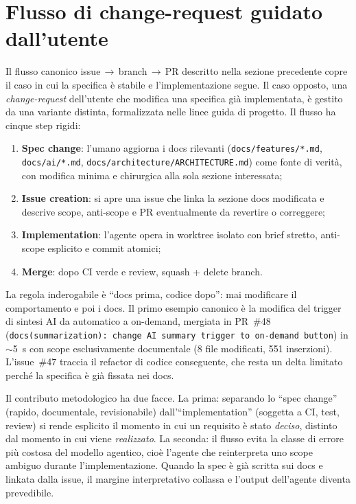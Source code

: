 \section{Flusso di change-request guidato dall'utente}
\label{sec:change-request}
Il flusso canonico issue\,$\to$\,branch\,$\to$\,PR descritto nella
sezione precedente copre il caso in cui la specifica è stabile e
l'implementazione segue. Il caso opposto, una \emph{change-request}
dell'utente che modifica una specifica già implementata, è gestito da una
variante distinta, formalizzata nelle linee guida di progetto. Il flusso
ha cinque step rigidi:
\begin{enumerate}
  \item \textbf{Spec change}: l'umano aggiorna i docs rilevanti
        (\texttt{docs/features/*.md}, \texttt{docs/ai/*.md},
        \texttt{docs/architecture/ARCHITECTURE.md}) come fonte di verità,
        con modifica minima e chirurgica alla sola sezione interessata;
  \item \textbf{Issue creation}: si apre una issue che linka la sezione
        docs modificata e descrive scope, anti-scope e PR eventualmente
        da revertire o correggere;
  \item \textbf{Implementation}: l'agente opera in worktree isolato con
        brief stretto, anti-scope esplicito e commit atomici;
  \item \textbf{Merge}: dopo CI verde e review, squash + delete branch.
\end{enumerate}
La regola inderogabile è ``docs prima, codice dopo'': mai modificare il
comportamento e poi i docs. Il primo esempio canonico è la modifica del
trigger di sintesi AI da automatico a on-demand, mergiata in PR~\#48
(\texttt{docs(summarization): change AI summary trigger to on-demand
button}) in $\sim$5~s con scope esclusivamente documentale (8 file
modificati, 551 inserzioni). L'issue~\#47 traccia il refactor di codice
conseguente, che resta un delta limitato perché la specifica è già
fissata nei docs.

Il contributo metodologico ha due facce. La prima: separando lo ``spec
change'' (rapido, documentale, revisionabile) dall'``implementation''
(soggetta a CI, test, review) si rende esplicito il momento in cui un
requisito è stato \emph{deciso}, distinto dal momento in cui viene
\emph{realizzato}. La seconda: il flusso evita la classe di errore più
costosa del modello agentico, cioè l'agente che reinterpreta uno scope
ambiguo durante l'implementazione. Quando la spec è già scritta sui
docs e linkata dalla issue, il margine interpretativo collassa e
l'output dell'agente diventa prevedibile.

